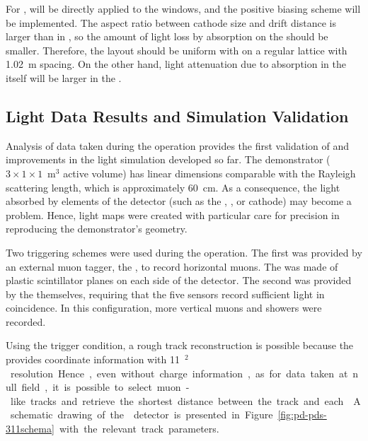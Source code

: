 For   ,  will be directly applied to the  windows, and the positive biasing scheme will be implemented. The aspect ratio between cathode size and drift distance is larger than in , so the amount of light loss by absorption on the  should be smaller. Therefore, the    layout should be uniform with  on a regular lattice with \SI{1.02}{m} spacing. On the other hand, light attenuation due to absorption in the \lar itself will be larger in the \dune \dpmod.


\subsection{ Light Data Results and Simulation Validation}

Analysis of data taken during the  operation provides the first validation of and improvements in the light simulation developed so far. 
The demonstrator ($3\times1\times1$~m$^3$ active volume) has linear dimensions comparable with the Rayleigh scattering length, which is approximately \SI{60}{\cm}. 
As a consequence, the light absorbed by elements of the detector (such as the , , or cathode) may become a problem.
Hence, light maps were created with particular care for precision in reproducing the demonstrator's geometry.

Two triggering schemes were used during the  operation.
The first was provided by an external muon tagger, the , to record horizontal muons. The  was made of plastic scintillator planes on each side of the detector.
The second was provided by the  themselves, requiring that the five sensors record sufficient light in coincidence. In this configuration, more vertical muons and showers were recorded.

Using the  trigger condition, a rough track reconstruction is possible because the  provides coordinate information with \SI{11}{\cm$^2$} resolution. Hence, even without charge information, as for data taken at null field, it is possible to select muon-like tracks and retrieve the shortest distance between the track and each . A schematic drawing of the  detector is presented in Figure~\ref{fig:pd-pds-311schema} with the relevant track parameters.

